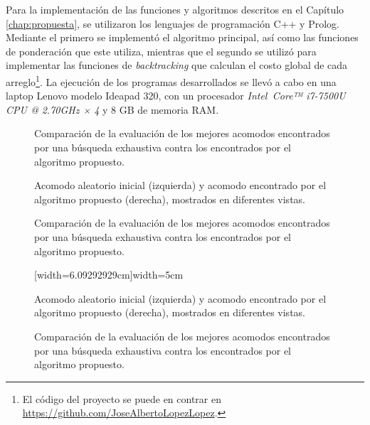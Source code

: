 Para la implementación de las funciones y algoritmos descritos en el Capítulo \ref{chap:propuesta}, se utilizaron los lenguajes de programación C++ y Prolog.
Mediante el primero se implementó el algoritmo principal, así como las funciones de ponderación que este utiliza, mientras que el segundo se utilizó para implementar las funciones de \textit{backtracking} que calculan el costo global de cada arreglo\footnote{El código del proyecto se puede en contrar en \url{https://github.com/JoseAlbertoLopezLopez}.}.
La ejecución de los programas desarrollados se llevó a cabo en una laptop Lenovo modelo Ideapad 320, con un procesador \textsl{Intel\,\raisebox{1.3pt}{\scriptsize\circledR} Core™ i7-7500U CPU @ 2.70GHz × 4} y 8 GB de memoria RAM.
%
\pagebreak
%
\captionsetup[figure]{skip = 13pt}%
%
%
\newlength{\oldintextsep}%
\setlength{\oldintextsep}{\intextsep}%
\setlength\intextsep{9pt}%
%
\begin{figure}[H]
	\caption{Comparación de la evaluación de los mejores acomodos encontrados por una búsqueda exhaustiva contra los encontrados por el algoritmo propuesto.}%
\end{figure}
\vfill%
\begin{figure}[H]
	\caption{Acomodo aleatorio inicial (izquierda) y acomodo encontrado por el algoritmo propuesto (derecha), mostrados en diferentes vistas.}%
\end{figure}
%
\begin{figure}[H]
	\caption{Comparación de la evaluación de los mejores acomodos encontrados por una búsqueda exhaustiva contra los encontrados por el algoritmo propuesto.}%
\end{figure}
\vspace{7pt}%
\begin{figure}[H]
	[width=6.09292929cm]{width=5cm}%
	\caption{Acomodo aleatorio inicial (izquierda) y acomodo encontrado por el algoritmo propuesto (derecha), mostrados en diferentes vistas.}
\end{figure}
%
\begin{figure}[H]
	\caption{Comparación de la evaluación de los mejores acomodos encontrados por una búsqueda exhaustiva contra los encontrados por el algoritmo propuesto.}%
\end{figure}

